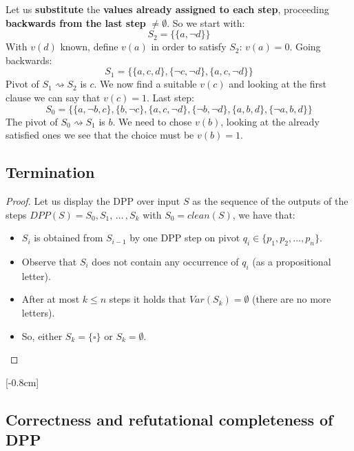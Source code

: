 Let us \textbf{substitute} the \textbf{values already assigned to each step}, proceeding \textbf{backwards from the last step} $\neq \emptyset$. So we start with:
$$ S_2 = \{\{a, \neg d\}\} $$
With $v(d)$ known, define $v(a)$ in order to satisfy $S_2$: $v(a) = 0$. Going backwards:
$$ S_1 = \{\{a,c,d\}, \{\neg c, \neg d\}, \{a,c,\neg d\}\} $$
Pivot of $S_1 \rightsquigarrow S_2$ is $c$. We now find a suitable $v(c)$ and looking at the first clause we can say that $v(c) = 1$. Last step:
$$S_0 = \{\{a, \neg b,  c\}, \{b, \neg c\}, \{a, c, \neg d\}, \{\neg b, \neg d\}, \{a,b,d\}, \{\neg a, b, d\}\} $$
The pivot of $S_0 \rightsquigarrow S_1$ is $b$. We need to chose $v(b)$, looking at the already satisfied ones we see that the choice must be $v(b) = 1$.

\subsection{Termination}

\begin{proof}
	Let us display the DPP over input $S$ as the sequence of the outputs of the steps $DPP(S) = S_0, S_1, \, \dots \, , S_k$ with $S_0 = clean(S)$, we have that:
\begin{itemize}

	\item $S_i$ is obtained from $S_{i-1}$ by one DPP step on pivot $q_i \in \{p_1, p_2, \ldots, p_n\}$.\\

	\item Observe that $S_i$ does not contain any occurrence of $q_i$ (as a propositional letter).\\

	\item After at most $k \leq n$ steps it holds that $Var(S_k) = \emptyset$ (there are no more letters).\\

	\item So, either $S_k = \{\square\}$ or $S_k = \emptyset$.
\end{itemize}
\end{proof}


[-0.8cm]

\vspace{-1cm}

\subsection{Correctness and refutational completeness of DPP}

